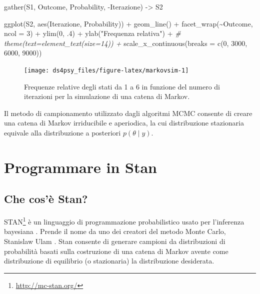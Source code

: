 \documentclass[
  11pt,
]{krantz}
\makeatletter
\newenvironment{Shaded}{\begin{snugshade}}{\end{snugshade}}
\newcommand{\AttributeTok}[1]{\textcolor[rgb]{0.61,0.61,0.61}{#1}}
\newcommand{\CommentTok}[1]{\textcolor[rgb]{0.37,0.37,0.37}{\textit{#1}}}
\newcommand{\DecValTok}[1]{\textcolor[rgb]{0.06,0.06,0.06}{#1}}
\newcommand{\FunctionTok}[1]{\textcolor[rgb]{0,0,0}{#1}}
\newcommand{\NormalTok}[1]{#1}
\newcommand{\OtherTok}[1]{\textcolor[rgb]{0.37,0.37,0.37}{#1}}
\newcommand{\SpecialCharTok}[1]{\textcolor[rgb]{0,0,0}{#1}}
\newcommand{\StringTok}[1]{\textcolor[rgb]{0.5,0.5,0.5}{#1}}
\renewcommand{\href}[2]{#2\footnote{\url{#1}}}
\newenvironment{kframe}{%
\medskip{}
\setlength{\fboxsep}{.8em}
 \def\at@end@of@kframe{}%
 \ifinner\ifhmode%
  \def\at@end@of@kframe{\end{minipage}}%
  \begin{minipage}{\columnwidth}%
 \fi\fi%
 \def\FrameCommand##1{\hskip\@totalleftmargin \hskip-\fboxsep
 \colorbox{shadecolor}{##1}\hskip-\fboxsep
     \hskip-\linewidth \hskip-\@totalleftmargin \hskip\columnwidth}%
 \MakeFramed {\advance\hsize-\width
   \@totalleftmargin\z@ \linewidth\hsize
   \@setminipage}}%
 {\par\unskip\endMakeFramed%
 \at@end@of@kframe}
\renewenvironment{Shaded}{\begin{kframe}}{\end{kframe}}
\theoremstyle{definition}
\theoremstyle{definition}
\theoremstyle{definition}
\theoremstyle{definition}
\theoremstyle{remark}
\makeatother
\begin{document}
\begin{Shaded}
\begin{Highlighting}[]
\FunctionTok{gather}\NormalTok{(S1, Outcome, Probability, }\SpecialCharTok{{-}}\NormalTok{Iterazione) }\OtherTok{{-}\textgreater{}}\NormalTok{ S2}

\FunctionTok{ggplot}\NormalTok{(S2, }\FunctionTok{aes}\NormalTok{(Iterazione, Probability)) }\SpecialCharTok{+}
  \FunctionTok{geom\_line}\NormalTok{() }\SpecialCharTok{+}
  \FunctionTok{facet\_wrap}\NormalTok{(}\SpecialCharTok{\textasciitilde{}}\NormalTok{Outcome, }\AttributeTok{ncol =} \DecValTok{3}\NormalTok{) }\SpecialCharTok{+}
  \FunctionTok{ylim}\NormalTok{(}\DecValTok{0}\NormalTok{, .}\DecValTok{4}\NormalTok{) }\SpecialCharTok{+}
  \FunctionTok{ylab}\NormalTok{(}\StringTok{"Frequenza relativa"}\NormalTok{) }\SpecialCharTok{+}
  \CommentTok{\# theme(text=element\_text(size=14))  +}
  \FunctionTok{scale\_x\_continuous}\NormalTok{(}\AttributeTok{breaks =} \FunctionTok{c}\NormalTok{(}\DecValTok{0}\NormalTok{, }\DecValTok{3000}\NormalTok{, }\DecValTok{6000}\NormalTok{, }\DecValTok{9000}\NormalTok{))}
\end{Highlighting}
\end{Shaded}

\begin{figure}[h]

{\centering \texttt{[image: ds4psy\_files/figure-latex/markovsim-1]} 

}

\caption{Frequenze relative degli stati da 1 a 6 in funzione del numero di iterazioni per la simulazione di una catena di Markov.}\label{fig:markovsim}
\end{figure}

Il metodo di campionamento utilizzato dagli algoritmi MCMC consente di creare una catena di Markov irriducibile e aperiodica, la cui distribuzione stazionaria equivale alla distribuzione a posteriori \(p(\theta \mid y)\).

\hypertarget{intro-stan}{%
\chapter{Programmare in Stan}\label{intro-stan}}

\hypertarget{che-cosuxe8-stan}{%
\section{Che cos'è Stan?}\label{che-cosuxe8-stan}}

\href{http://mc-stan.org/}{STAN} è un linguaggio di programmazione probabilistico usato per l'inferenza bayesiana \citep{carpenter2017stan}. Prende il nome da uno dei creatori del metodo Monte Carlo, Stanislaw Ulam \citep{Eckhardt1987stan}. Stan consente di generare campioni da distribuzioni di probabilità basati sulla costruzione di una catena di Markov avente come distribuzione di equilibrio (o stazionaria) la distribuzione desiderata.
\end{document}
